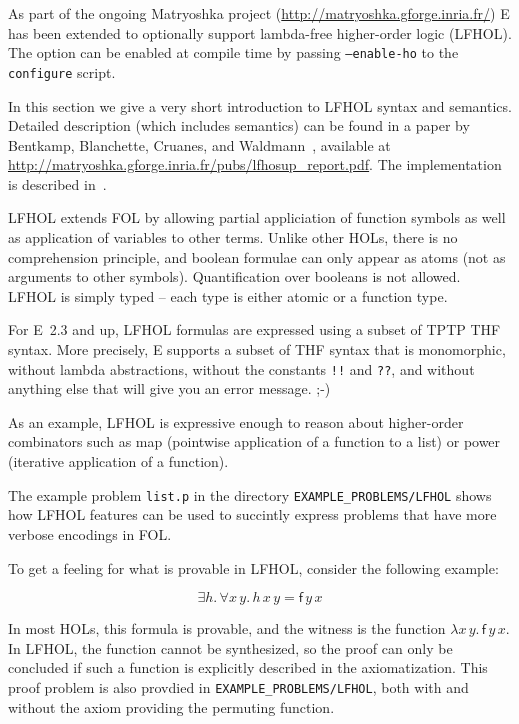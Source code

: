\documentclass{report}
\begin{document}
As part of the ongoing Matryoshka project
(\url{http://matryoshka.gforge.inria.fr/}) E has been extended to
optionally support lambda-free higher-order logic (LFHOL). The option
can be enabled at compile time by passing \texttt{--enable-ho} to the
\texttt{configure} script.

In this section we give a very short introduction to LFHOL syntax and
semantics. Detailed description (which includes semantics) can be
found in a paper by Bentkamp, Blanchette, Cruanes, and
Waldmann~\cite{BBCW:IJCAR-2018}, available at
\url{http://matryoshka.gforge.inria.fr/pubs/lfhosup_report.pdf}. The
implementation is described
in~\cite{VBCS:TACAS-2019,VBCS:LFHOReport-2018}.

LFHOL extends FOL by allowing partial appliciation of function symbols
as well as application of variables to other terms. Unlike other HOLs,
there is no comprehension principle, and boolean formulae can only
appear as atoms (not as arguments to other symbols). Quantification
over booleans is not allowed. LFHOL is simply typed -- each type is
either atomic or a function type.

For E~2.3 and up, LFHOL formulas are expressed using a subset of TPTP
THF syntax. More precisely, E supports a subset of THF syntax that is
monomorphic, without lambda abstractions, without the constants
\texttt{!!}  and \texttt{??}, and without anything else that will give
you an error message. ;-)

As an example, LFHOL is expressive enough to reason about higher-order
combinators such as \textsf{map} (pointwise application of a function
to a list) or \textsf{power} (iterative application of a function).

The example problem \texttt{list.p} in the directory
\texttt{EXAMPLE\_PROBLEMS/LFHOL} shows how LFHOL features can be used
to succintly express problems that have more verbose encodings in FOL.

To get a feeling for what is provable in LFHOL, consider the following
example:

$$  \exists h.\, \forall x \, y. \, h \, x \, y = \textsf{f}  \, y \, x $$

In most HOLs, this formula is provable, and the witness is the
function $\lambda x \, y. \, \textsf{f} \, y \, x$. In LFHOL, the
function cannot be synthesized, so the proof can only be concluded if
such a function is explicitly described in the axiomatization.  This
proof problem is also provdied in \texttt{EXAMPLE\_PROBLEMS/LFHOL},
both with and without the axiom providing the permuting function.
\end{document}
